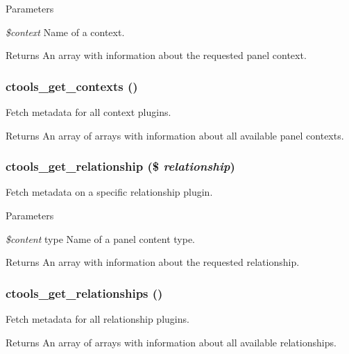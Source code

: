 \begin{DoxyParams}{Parameters}
\item[{\em \$context}]Name of a context.\end{DoxyParams}
\begin{DoxyReturn}{Returns}
An array with information about the requested panel context. 
\end{DoxyReturn}
\hypertarget{context_8inc_a7fc01c6d2b4a8e5d734a71a824346f21}{
\subsubsection[{ctools\_\-get\_\-contexts}]{\setlength{\rightskip}{0pt plus 5cm}ctools\_\-get\_\-contexts ()}}
\label{context_8inc_a7fc01c6d2b4a8e5d734a71a824346f21}
Fetch metadata for all context plugins.

\begin{DoxyReturn}{Returns}
An array of arrays with information about all available panel contexts. 
\end{DoxyReturn}
\hypertarget{context_8inc_abd6deaf7e63e6d063b4cda2e0075efd7}{
\subsubsection[{ctools\_\-get\_\-relationship}]{\setlength{\rightskip}{0pt plus 5cm}ctools\_\-get\_\-relationship (\$ {\em relationship})}}
\label{context_8inc_abd6deaf7e63e6d063b4cda2e0075efd7}
Fetch metadata on a specific relationship plugin.


\begin{DoxyParams}{Parameters}
\item[{\em \$content}]type Name of a panel content type.\end{DoxyParams}
\begin{DoxyReturn}{Returns}
An array with information about the requested relationship. 
\end{DoxyReturn}
\hypertarget{context_8inc_a6d2449b6abd59d11ec96d325d3b1d341}{
\subsubsection[{ctools\_\-get\_\-relationships}]{\setlength{\rightskip}{0pt plus 5cm}ctools\_\-get\_\-relationships ()}}
\label{context_8inc_a6d2449b6abd59d11ec96d325d3b1d341}
Fetch metadata for all relationship plugins.

\begin{DoxyReturn}{Returns}
An array of arrays with information about all available relationships. 
\end{DoxyReturn}
